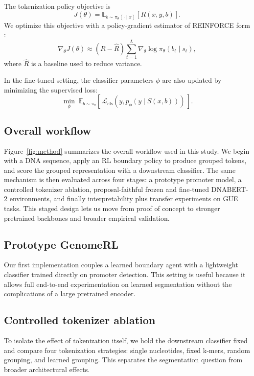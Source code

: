 \documentclass[sigconf,screen]{acmart}
\newcommand{\method}{GenomeRL\xspace}
\newcommand{\dnabert}{DNABERT-2\xspace}
\begin{document}
The tokenization policy objective is
\begin{equation}
    J(\theta) = \mathbb{E}_{b \sim \pi_\theta(\cdot \mid x)}[R(x,y,b)].
\end{equation}
We optimize this objective with a policy-gradient estimator of REINFORCE form \cite{williams1992simple,sutton2018reinforcement}:
\begin{equation}
    \nabla_\theta J(\theta) \approx
    \left(R - \hat{R}\right)
    \sum_{t=1}^{L}\nabla_\theta \log \pi_\theta(b_t \mid s_t),
\end{equation}
where $\hat{R}$ is a baseline used to reduce variance.

In the fine-tuned setting, the classifier parameters $\phi$ are also updated by minimizing the supervised loss:
\begin{equation}
    \min_{\phi}\;\mathbb{E}_{b \sim \pi_\theta}[\,\mathcal{L}_{\mathrm{cls}}(y, p_\phi(y \mid S(x,b)))\,].
\end{equation}

\subsection{Overall workflow}
Figure~\ref{fig:method} summarizes the overall workflow used in this study. We begin with a DNA sequence, apply an RL boundary policy to produce grouped tokens, and score the grouped representation with a downstream classifier. The same mechanism is then evaluated across four stages: a prototype promoter model, a controlled tokenizer ablation, proposal-faithful frozen and fine-tuned \dnabert environments, and finally interpretability plus transfer experiments on GUE tasks. This staged design lets us move from proof of concept to stronger pretrained backbones and broader empirical validation.

\subsection{Prototype \method}
Our first implementation couples a learned boundary agent with a lightweight classifier trained directly on promoter detection. This setting is useful because it allows full end-to-end experimentation on learned segmentation without the complications of a large pretrained encoder.

\subsection{Controlled tokenizer ablation}
To isolate the effect of tokenization itself, we hold the downstream classifier fixed and compare four tokenization strategies: single nucleotides, fixed k-mers, random grouping, and learned grouping. This separates the segmentation question from broader architectural effects.
\end{document}
